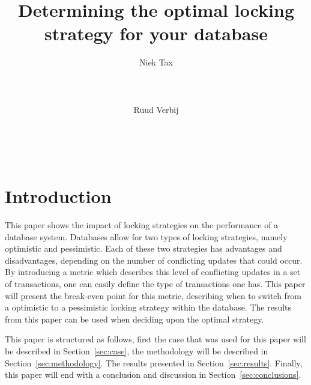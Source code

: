 \documentclass{sig-alternate-br}
\begin{document}

\title{Determining the optimal locking strategy for your database}

\author{
\alignauthor Niek Tax\\
       \\
       \\
       \\
\alignauthor Ruud Verbij\\
       \\
       \\
       \\
}

\maketitle
\begin{abstract}
\end{abstract}


\section{Introduction}
\label{sec:intro}
This paper shows the impact of locking strategies on the performance of a database system. Databases allow for two types of locking strategies, namely optimistic and pessimistic. Each of these two strategies has advantages and disadvantages, depending on the number of conflicting updates that could occur. By introducing a metric which describes this level of conflicting updates in a set of transactions, one can easily define the type of transactions one has. This paper will present the break-even point for this metric, describing when to switch from a optimistic to a pessimistic locking strategy within the database. The results from this paper can be used when deciding upon the optimal strategy.

This paper is structured as follows, first the case that was used for this paper will be described in Section~\ref{sec:case}, the methodology will be described in Section~\ref{sec:methodology}. The results presented in Section~\ref{sec:results}. Finally, this paper will end with a conclusion and discussion in Section~\ref{sec:conclusions}.
\end{document}
